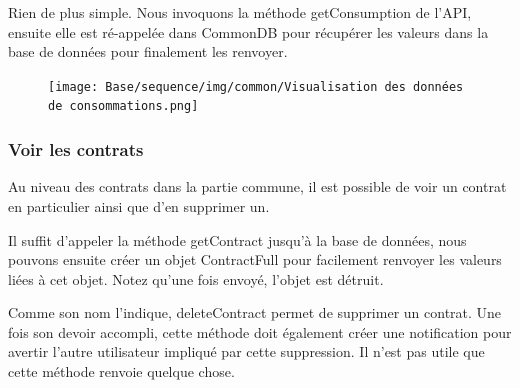 \begin{flushleft}
Rien de plus simple. Nous invoquons la méthode getConsumption de l'API, ensuite elle est ré-appelée dans CommonDB pour récupérer les valeurs dans la base de données pour finalement les renvoyer.
\end{flushleft}

\begin{figure}[h]
\centering
\texttt{[image: Base/sequence/img/common/Visualisation des données de consommations.png]}
\end{figure}

\newpage

\subsubsection{Voir les contrats}

\begin{flushleft}
Au niveau des contrats dans la partie commune, il est possible de voir un contrat en particulier ainsi que d'en supprimer un.
\end{flushleft}

\begin{flushleft}
Il suffit d'appeler la méthode getContract jusqu'à la base de données, nous pouvons ensuite créer un objet ContractFull pour facilement renvoyer les valeurs liées à cet objet. Notez qu'une fois envoyé, l'objet est détruit.
\end{flushleft}

\begin{flushleft}
Comme son nom l'indique, deleteContract permet de supprimer un contrat. Une fois son devoir accompli, cette méthode doit également créer une notification pour avertir l'autre utilisateur impliqué par cette suppression. Il n'est pas utile que cette méthode renvoie quelque chose.
\end{flushleft}

